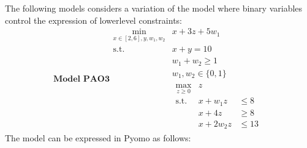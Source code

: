 \documentclass[letterpaper,10pt,english]{sphinxmanual}
\begin{document}
The following models considers a variation of the  model where
binary variables control the expression of lower\sphinxhyphen{}level constraints:
\label{equation:sand:eq-pao3} \begin{equation*}
 \textbf{Model PAO3}
 \begin{array}{ll}
 \min_{x\in[2,6],y,w_1,w_2} & x + 3 z + 5 w_1\\
 \textrm{s.t.} & x + y = 10\\
 & w_1 + w_2 \geq 1\\
 & w_1,w_2 \in \{0,1\}\\
 & \begin{array}{lll}
   \max_{z \geq 0} & z &\\
   \textrm{s.t.} & x+ w_1 z &\leq 8\\
   & x + 4 z &\geq 8\\
   & x + 2 w_2 z &\leq 13
   \end{array}
 \end{array}
 \end{equation*}
The  model can be expressed in Pyomo as follows:
\end{document}
